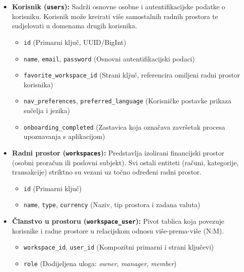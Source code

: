 \documentclass[a4paper,12pt,oneside]{article}
\begin{document}
	\begin{itemize}
		\item \textbf{Korisnik (\texttt{users}):} Sadrži osnovne osobne i autentifikacijske podatke o korisniku. Korisnik može kreirati više samostalnih radnih prostora te sudjelovati u domenama drugih korisnika.
		\begin{itemize}
			\item \texttt{id} (Primarni ključ, UUID/BigInt)
			\item \texttt{name}, \texttt{email}, \texttt{password} (Osnovni autentifikacijski podaci)
			\item \texttt{favorite\_workspace\_id} (Strani ključ, referencira omiljeni radni prostor korisnika)
			\item \texttt{nav\_preferences}, \texttt{preferred\_language} (Korisničke postavke prikaza sučelja i jezika)
			\item \texttt{onboarding\_completed} (Zastavica koja označava završetak procesa upoznavanja s aplikacijom)
		\end{itemize}
		
		\item \textbf{Radni prostor (\texttt{workspaces}):} Predstavlja izolirani financijski prostor (osobni proračun ili poslovni subjekt). Svi ostali entiteti (računi, kategorije, transakcije) striktno su vezani uz točno određeni radni prostor.
		\begin{itemize}
			\item \texttt{id} (Primarni ključ)
			\item \texttt{name}, \texttt{type}, \texttt{currency} (Naziv, tip prostora i zadana valuta)
		\end{itemize}
		
		\item \textbf{Članstvo u prostoru (\texttt{workspace\_user}):} Pivot tablica koja povezuje korisnike i radne prostore u relacijskom odnosu više-prema-više (N:M).
		\begin{itemize}
			\item \texttt{workspace\_id}, \texttt{user\_id} (Kompozitni primarni i strani ključevi)
			\item \texttt{role} (Dodijeljena uloga: \textit{owner}, \textit{manager}, \textit{member})
		\end{itemize}
		

\end{itemize}
\end{document}
